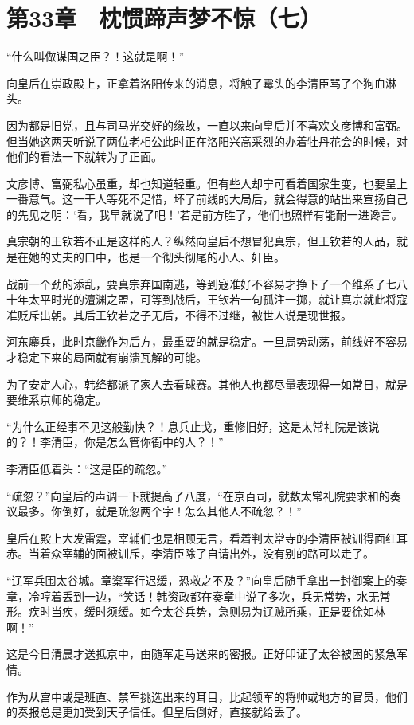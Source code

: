 \section{第33章　枕惯蹄声梦不惊（七）}

“什么叫做谋国之臣？！这就是啊！” 

向皇后在崇政殿上，正拿着洛阳传来的消息，将触了霉头的李清臣骂了个狗血淋头。 

因为都是旧党，且与司马光交好的缘故，一直以来向皇后并不喜欢文彦博和富弼。但当她这两天听说了两位老相公此时正在洛阳兴高采烈的办着牡丹花会的时候，对他们的看法一下就转为了正面。 

文彦博、富弼私心虽重，却也知道轻重。但有些人却宁可看着国家生变，也要呈上一番意气。这一干人等死不足惜，坏了前线的大局后，就会得意的站出来宣扬自己的先见之明：‘看，我早就说了吧！’若是前方胜了，他们也照样有能耐一进谗言。 

真宗朝的王钦若不正是这样的人？纵然向皇后不想冒犯真宗，但王钦若的人品，就是在她的丈夫的口中，也是一个彻头彻尾的小人、奸臣。 

战前一个劲的添乱，要真宗弃国南逃，等到寇准好不容易才挣下了一个维系了七八十年太平时光的澶渊之盟，可等到战后，王钦若一句孤注一掷，就让真宗就此将寇准贬斥出朝。其后王钦若之子无后，不得不过继，被世人说是现世报。 

河东鏖兵，此时京畿作为后方，最重要的就是稳定。一旦局势动荡，前线好不容易才稳定下来的局面就有崩溃瓦解的可能。 

为了安定人心，韩绛都派了家人去看球赛。其他人也都尽量表现得一如常日，就是要维系京师的稳定。 

“为什么正经事不见这般勤快？！息兵止戈，重修旧好，这是太常礼院是该说的？！李清臣，你是怎么管你衙中的人？！” 

李清臣低着头：“这是臣的疏忽。” 

“疏忽？”向皇后的声调一下就提高了八度，“在京百司，就数太常礼院要求和的奏议最多。你倒好，就是疏忽两个字！怎么其他人不疏忽？！” 

皇后在殿上大发雷霆，宰辅们也是相顾无言，看着判太常寺的李清臣被训得面红耳赤。当着众宰辅的面被训斥，李清臣除了自请出外，没有别的路可以走了。 

“辽军兵围太谷城。章楶军行迟缓，恐救之不及？”向皇后随手拿出一封御案上的奏章，冷哼着丢到一边，“笑话！韩资政都在奏章中说了多次，兵无常势，水无常形。疾时当疾，缓时须缓。如今太谷兵势，急则易为辽贼所乘，正是要徐如林啊！” 

这是今日清晨才送抵京中，由随军走马送来的密报。正好印证了太谷被困的紧急军情。 

作为从宫中或是班直、禁军挑选出来的耳目，比起领军的将帅或地方的官员，他们的奏报总是更加受到天子信任。但皇后倒好，直接就给丢了。 


